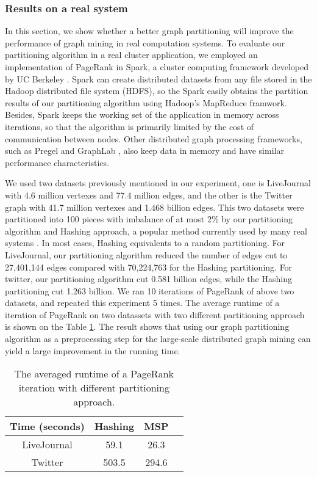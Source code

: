 \documentclass{acm_proc_article-sp}
\begin{document}
\subsubsection {Results on a real system}
In this section, we show whether a better graph partitioning will improve the performance of graph mining in real computation systems. To evaluate our partitioning algorithm in a real cluster application, we employed an implementation of PageRank in Spark, a cluster computing framework developed by UC Berkeley \cite{Berkeley:spark}. Spark can create distributed datasets from any file stored in the Hadoop distributed file system (HDFS), so the Spark easily obtains the partition results of our partitioning algorithm using Hadoop's MapReduce framwork. Besides, Spark keeps the working set of the application in memory across iterations, so that the algorithm is primarily limited by the cost of communication between nodes. Other distributed graph processing frameworks, such as Pregel \cite{malewicz:pregel} and GraphLab \cite{yucheng:graphlab}, also keep data in memory and have similar performance characteristics.
\par
We used two datasets previously mentioned in our experiment, one is LiveJournal with 4.6 million vertexes and 77.4 million edges, and the other is the Twitter graph with 41.7 million vertexes and 1.468 billion edges. This two datasets were partitioned into 100 pieces with imbalance of at most 2\% by our partitioning algorithm and Hashing approach, a popular method currently used by many real systems \cite{malewicz:pregel}. In most cases, Hashing equivalents to a random partitioning. For LiveJournal, our partitioning algorithm reduced the number of edges cut to 27,401,144 edges compared with 70,224,763 for the Hashing partitioning. For twitter, our partitioning algorithm cut 0.581 billion edges, while the Hashing partitioning cut 1.263 billion. We ran 10 iterations of PageRank of above two datasets, and repeated this experiment 5 times. The average runtime of a iteration of PageRank on two datassets with two different partitioning approach is shown on the Table \ref{table:par}. The result shows that using our graph partitioning algorithm as a preprocessing step for the large-scale distributed graph mining can yield a large improvement in the running time.
\begin{table}
\centering
\caption{The averaged runtime of a PageRank iteration with different partitioning approach.}
\label{table:par}
\begin{tabular}{|c|c|c|c|}
\hline
 Time (seconds)  &   Hashing   &   MSP     \\
\hline
LiveJournal          & 59.1   & 26.3    \\
\hline
Twitter         	& 503.5 	 & 294.6   \\
\hline
\end{tabular}
\end{table}
\end{document}
